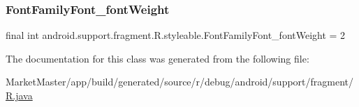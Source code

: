 \mbox{\label{classandroid_1_1support_1_1fragment_1_1R_1_1styleable_a8af402b9cdd397b2b12747e94e2e362c}} 
\subsubsection{\texorpdfstring{Font\+Family\+Font\+\_\+font\+Weight}{FontFamilyFont\_fontWeight}}
{\footnotesize\ttfamily final int android.\+support.\+fragment.\+R.\+styleable.\+Font\+Family\+Font\+\_\+font\+Weight = 2\hspace{0.3cm}{\ttfamily [static]}}



The documentation for this class was generated from the following file\+:\begin{DoxyCompactItemize}
\item 
Market\+Master/app/build/generated/source/r/debug/android/support/fragment/\mbox{\hyperlink{debug_2android_2support_2fragment_2R_8java}{R.\+java}}\end{DoxyCompactItemize}
